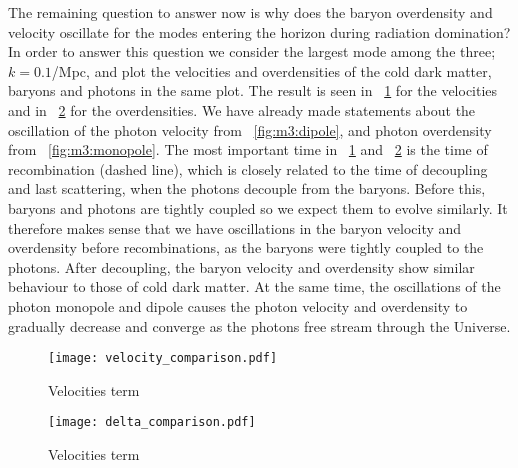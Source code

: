     The remaining question to answer now is why does the baryon overdensity and velocity oscillate for the modes entering the horizon during radiation domination? In order to answer this question we consider the largest mode among the three; $k=0.1$/Mpc, and plot the velocities and overdensities of the cold dark matter, baryons and photons in the same plot. The result is seen in ~\cref{fig:m3:velocity_comparison} for the velocities and in ~\cref{fig:m3:delta_comparison} for the overdensities. We have already made statements about the oscillation of the photon velocity from ~\cref{fig:m3:dipole}, and photon overdensity from ~\cref{fig:m3:monopole}. The most important time in ~\cref{fig:m3:velocity_comparison} and ~\cref{fig:m3:delta_comparison} is the time of recombination (dashed line), which is closely related to the time of decoupling and last scattering, when the photons decouple from the baryons. Before this, baryons and photons are tightly coupled so we expect them to evolve similarly. It therefore makes sense that we have oscillations in the baryon velocity and overdensity before recombinations, as the baryons were tightly coupled to the photons. After decoupling, the baryon velocity and overdensity show similar behaviour to those of cold dark matter. At the same time, the oscillations of the photon monopole and dipole causes the photon velocity and overdensity to gradually decrease and converge as the photons free stream through the Universe. 

    \begin{figure}
        \texttt{[image: velocity\_comparison.pdf]}
        \caption{Velocities term}
        \label{fig:m3:velocity_comparison}
    \end{figure}

    \begin{figure}
        \texttt{[image: delta\_comparison.pdf]}
        \caption{Velocities term}
        \label{fig:m3:delta_comparison}
    \end{figure}

